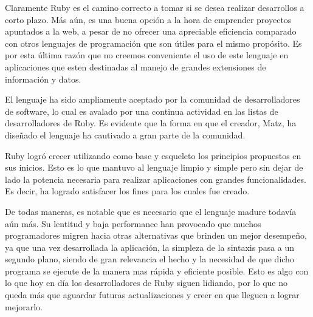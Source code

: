 \documentclass{article}
\begin{document}
	Claramente Ruby es el camino correcto a tomar si se desea realizar desarrollos a corto plazo. Más aún, es una buena opción a la hora de emprender proyectos apuntados a la web, a pesar de no ofrecer una apreciable eficiencia comparado con otros lenguajes de programación que son útiles para el mismo propósito. Es por esta última razón que no creemos conveniente el uso de este lenguaje en aplicaciones que esten destinadas al manejo de grandes extensiones de información y datos.
	\par
	El lenguaje ha sido ampliamente aceptado por la comunidad de desarrolladores de software, lo cual es avalado por una continua actividad en las listas de desarrolladores de Ruby. Es evidente que la forma en que el creador, Matz, ha diseñado el lenguaje ha cautivado a gran parte de la comunidad.
	\par
	Ruby logró crecer utilizando como base y esqueleto los principios propuestos en sus inicios. Esto es lo que mantuvo al lenguaje limpio y simple pero sin dejar de lado la potencia necesaria para realizar aplicaciones con grandes funcionalidades. Es decir, ha logrado satisfacer los fines para los cuales fue creado.
	\par
	De todas maneras, es notable que es necesario que el lenguaje madure todavía aún más. Su lentitud y baja performance han provocado que muchos programadores migren hacia otras alternativas que brinden un mejor desempeño, ya que una vez desarrollada la aplicación, la simpleza de la sintaxis pasa a un segundo plano, siendo de gran relevancia el hecho y la necesidad de que dicho programa se ejecute de la manera mas rápida y eficiente posible. Esto es algo con lo que hoy en día los desarrolladores de Ruby siguen lidiando, por lo que no queda más que aguardar futuras actualizaciones y creer en que lleguen a lograr mejorarlo.
\end{document}
